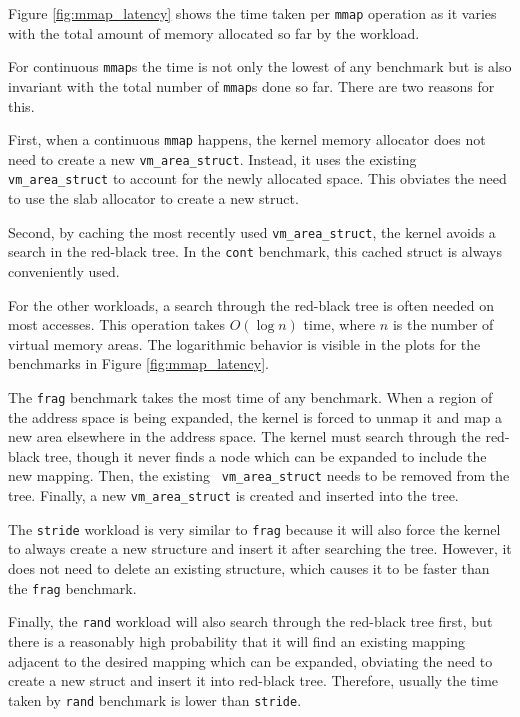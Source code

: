 \documentclass[twocolumn,11pt]{article}
\begin{document}
Figure \ref{fig:mmap_latency} shows the time taken
per \texttt{mmap} operation as it varies with the total amount of memory allocated
so far by the workload. 

For continuous \texttt{mmap}s the time is not only the lowest of any benchmark
but is also invariant with the total number of \texttt{mmap}s done so far.
There are two reasons for this. 

First, when a continuous \texttt{mmap} happens, the
kernel memory allocator does not need to create a new \texttt{vm\_area\_struct}.
Instead, it uses the existing \texttt{vm\_area\_struct} to account for the
newly allocated space. This obviates the need to use the slab allocator to create
a new struct. 

Second, by caching the
most recently used \texttt{vm\_area\_struct}, the kernel avoids a search in the
red-black tree. In the \texttt{cont} benchmark, this cached struct is always
conveniently used.

For the other workloads, a search through the red-black tree is often needed on
most accesses. This operation takes $O(\log n)$ time, where $n$ is the number of
virtual memory areas. The logarithmic behavior is visible in the plots for the
benchmarks in Figure \ref{fig:mmap_latency}.

The \texttt{frag} benchmark takes the most time of any benchmark. When a region
of the address space is being expanded, the kernel is forced to unmap it and
map a new area elsewhere in the address space.  The kernel must search through
the red-black tree, though it never finds a node which can be expanded to
include the new mapping.  Then, the existing \texttt{ vm\_area\_struct} needs
to be removed from the tree.  Finally, a new \texttt{vm\_area\_struct} is
created and inserted into the tree.

The \texttt{stride} workload is very similar to \texttt{frag} because it will also force the
kernel to always create a new structure and insert it after
searching the tree. However, it does not need to delete an existing
structure, which causes it to be faster than the \texttt{frag} benchmark.

Finally, the \texttt{rand} workload will also search through the red-black tree first,
but there is a reasonably high probability that it will find an existing
mapping adjacent to the desired mapping which can be expanded, obviating the
need to create a new struct and insert it into red-black tree. Therefore, usually
the time taken by \texttt{rand} benchmark is lower than \texttt{stride}.
\end{document}
